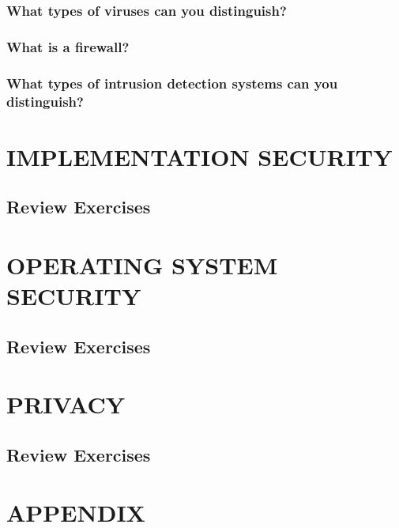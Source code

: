 \documentclass[a4paper, 10 pt, conference]{ieeeconf}
\begin{document}
\subsubsection{\textbf{What types of viruses can you distinguish?}}

\subsubsection{\textbf{What is a firewall?}}

\subsubsection{\textbf{What types of intrusion detection systems can you distinguish?}}






\section{\textbf{IMPLEMENTATION SECURITY}}
\subsection{\textbf{Review Exercises}}






\section{\textbf{OPERATING SYSTEM SECURITY}}
\subsection{\textbf{Review Exercises}}






\section{\textbf{PRIVACY}}
\subsection{\textbf{Review Exercises}}

\section*{APPENDIX}



\end{document}
